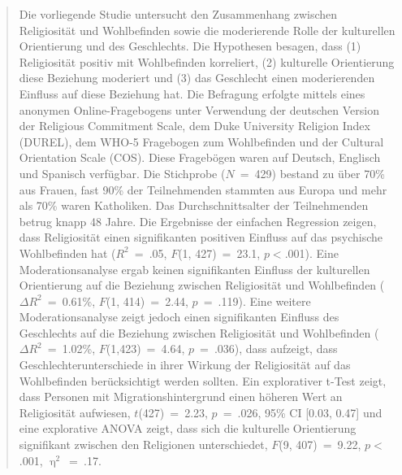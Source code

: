 \setcounter{abstractpage}{\value{page}}

\begin{abstract}
 \thispagestyle{plain}
 \setcounter{page}{2}


  \noindent Die vorliegende Studie untersucht den Zusammenhang zwischen Religiosität und Wohlbefinden sowie die moderierende Rolle der kulturellen Orientierung und des Geschlechts. Die Hypothesen besagen, dass (1) Religiosität positiv mit Wohlbefinden korreliert, (2) kulturelle Orientierung diese Beziehung moderiert und (3) das Geschlecht einen moderierenden Einfluss auf diese Beziehung hat. 
  Die Befragung erfolgte mittels eines anonymen Online-Fragebogens unter Verwendung der deutschen Version der Religious Commitment Scale, dem Duke University Religion Index (DUREL), dem WHO-5 Fragebogen zum Wohlbefinden und der Cultural Orientation Scale (COS). Diese Fragebögen waren auf Deutsch, Englisch und Spanisch verfügbar. Die Stichprobe ($N$~=~429) bestand zu über 70\% aus Frauen, fast 90\% der Teilnehmenden stammten aus Europa und mehr als 70\% waren Katholiken. Das Durchschnittsalter der Teilnehmenden betrug knapp 48 Jahre.   
  Die Ergebnisse der einfachen Regression zeigen, dass Religiosität einen signifikanten positiven Einfluss auf das psychische Wohlbefinden hat ($R^2$~=~.05, $F$(1, 427)~=~23.1, $p<$.001). Eine Moderationsanalyse ergab keinen signifikanten Einfluss der kulturellen Orientierung auf die Beziehung zwischen Religiosität und Wohlbefinden ($\Delta R^2$~=~0.61\%, $F$(1, 414)~=~2.44, $p$~=~.119). Eine weitere Moderationsanalyse zeigt jedoch einen signifikanten Einfluss des Geschlechts auf die Beziehung zwischen Religiosität und Wohlbefinden ($\Delta R^2$~=~1.02\%, $F$(1,423)~=~4.64, $p$~=~.036), dass aufzeigt, dass Geschlechterunterschiede in ihrer Wirkung der Religiosität auf das Wohlbefinden berücksichtigt werden sollten. Ein explorativer t-Test zeigt, dass Personen mit Migrationshintergrund einen höheren Wert an Religiosität aufwiesen, $t$(427)~=~2.23, $p$~=~.026, 95\% CI [0.03, 0.47] und eine explorative ANOVA zeigt, dass sich die kulturelle Orientierung signifikant zwischen den Religionen unterschiedet, $F$(9, 407)~=~9.22, $p<$.001, $\upeta^{2}$~=~.17.
  
  
  

\end{abstract}
